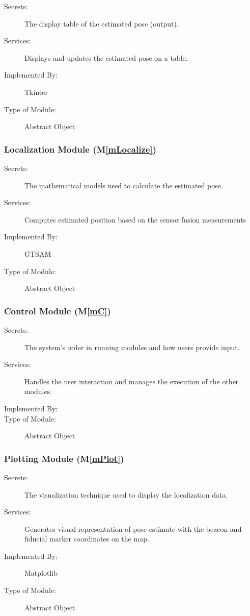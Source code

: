 \documentclass[12pt, titlepage]{article}
\newcommand{\mref}[1]{M\ref{#1}}
\begin{document}
\begin{description}
\item[Secrets:]The display table of the estimated pose (output).
\item[Services:]Displays and updates the estimated pose on a table.
\item[Implemented By:] Tkinter
\item[Type of Module:] Abstract Object
\end{description}

\subsubsection{Localization Module (\mref{mLocalize})}

\begin{description}
\item[Secrets:]The mathematical models used to calculate the estimated pose.
\item[Services:]Computes estimated position based on the sensor fusion measurements
\item[Implemented By:] GTSAM
\item[Type of Module:] Abstract Object
\end{description}

\subsubsection{Control Module (\mref{mC})}

\begin{description}
\item[Secrets:]The system's order in running modules and how users provide input.
\item[Services:]Handles the user interaction and manages the execution of the other modules.
\item[Implemented By:] \progname
\item[Type of Module:] Abstract Object
\end{description}

\subsubsection{Plotting Module (\mref{mPlot})}

\begin{description}
\item[Secrets:]The visualization technique used to display the localization data.
\item[Services:]Generates visual representation of pose estimate with the beacon and fiducial marker coordinates on the map.
\item[Implemented By:] Matplotlib
\item[Type of Module:] Abstract Object
\end{description}
\end{document}
